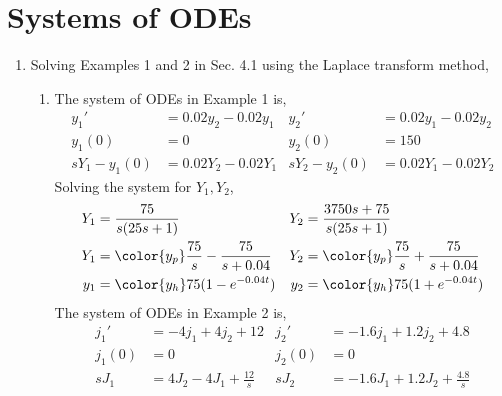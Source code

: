 \section{Systems of ODEs}

\begin{enumerate}
    \item Solving Examples 1 and 2 in Sec. 4.1 using the Laplace transform method,
          \begin{enumerate}
              \item The system of ODEs in Example 1 is,
                    \begin{align}
                        y_1'          & = 0.02y_2 - 0.02y_1 &
                        y_2'          & = 0.02y_1 - 0.02y_2   \\
                        y_1(0)        & = 0                 &
                        y_2(0)        & = 150                 \\
                        sY_1 - y_1(0) & = 0.02Y_2 - 0.02Y_1 &
                        sY_2 - y_2(0) & = 0.02Y_1 - 0.02Y_2
                    \end{align}
                    Solving the system for $ Y_1, Y_2 $,
                    \begin{align}
                        Y_1 & = \frac{75}{s(25s + 1)}                          &
                        Y_2 & = \frac{3750s + 75}{s(25s + 1)}                    \\
                        Y_1 & = \color{y_p} \frac{75}{s} - \frac{75}{s + 0.04} &
                        Y_2 & = \color{y_p} \frac{75}{s} + \frac{75}{s + 0.04}   \\
                        y_1 & = \color{y_h} 75(1 - e^{-0.04t})                 &
                        y_2 & = \color{y_h} 75(1 + e^{-0.04t})
                    \end{align}
                    The system of ODEs in Example 2 is,
                    \begin{align}
                        j_1'   & = -4j_1 + 4j_2 + 12                &
                        j_2'   & = -1.6j_1 + 1.2j_2 + 4.8             \\
                        j_1(0) & = 0                                &
                        j_2(0) & = 0                                  \\
                        sJ_1   & = 4J_2 - 4J_1 + \frac{12}{s}       &
                        sJ_2   & = -1.6J_1 + 1.2J_2 + \frac{4.8}{s}
                    \end{align}

\end{enumerate}
\end{enumerate}
